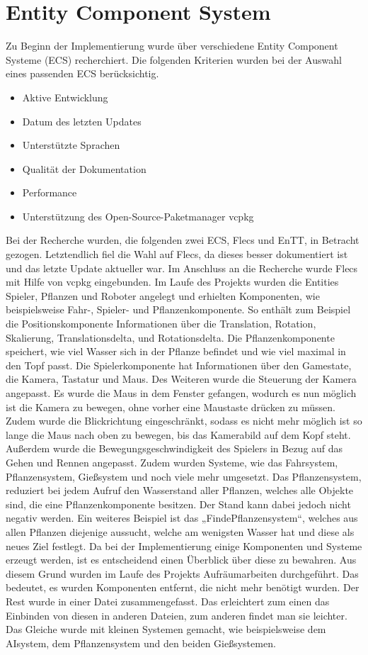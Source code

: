 
\section{Entity Component System}
Zu Beginn der Implementierung wurde über verschiedene Entity Component Systeme (ECS) recherchiert. Die folgenden Kriterien wurden bei der Auswahl eines passenden ECS berücksichtig. 
\begin{itemize}
	\item Aktive Entwicklung
	\item Datum des letzten Updates
	\item Unterstützte Sprachen
	\item Qualität der Dokumentation
	\item Performance
	\item Unterstützung des Open-Source-Paketmanager vcpkg
\end{itemize}
Bei der Recherche wurden, die folgenden zwei ECS, Flecs und EnTT, in Betracht gezogen. Letztendlich fiel die Wahl auf Flecs, da dieses besser dokumentiert ist und das letzte Update aktueller war. 
Im Anschluss an die Recherche wurde Flecs mit Hilfe von vcpkg eingebunden. Im Laufe des Projekts wurden die Entities Spieler, Pflanzen und Roboter angelegt und erhielten Komponenten, wie beispielsweise Fahr-, Spieler- und Pflanzenkomponente. So enthält zum Beispiel die Positionskomponente Informationen über die Translation, Rotation, Skalierung, Translationsdelta, und Rotationsdelta. Die Pflanzenkomponente speichert, wie viel Wasser sich in der Pflanze befindet und wie viel maximal in den Topf passt. Die Spielerkomponente hat Informationen über den Gamestate, die Kamera, Tastatur und Maus. Des Weiteren wurde die Steuerung der Kamera angepasst. Es wurde die Maus in dem Fenster gefangen, wodurch es nun möglich ist die Kamera zu bewegen, ohne vorher eine Maustaste drücken zu müssen. Zudem wurde die Blickrichtung eingeschränkt, sodass es nicht mehr möglich ist so lange die Maus nach oben zu bewegen, bis das Kamerabild auf dem Kopf steht. Außerdem wurde die Bewegungsgeschwindigkeit des Spielers in Bezug auf das Gehen und Rennen angepasst.
Zudem wurden Systeme, wie das Fahrsystem, Pflanzensystem, Gießsystem und noch viele mehr umgesetzt. Das Pflanzensystem, reduziert bei jedem Aufruf den Wasserstand aller Pflanzen, welches alle Objekte sind, die eine Pflanzenkomponente besitzen. Der Stand kann dabei jedoch nicht negativ werden. Ein weiteres Beispiel ist das „FindePflanzensystem“, welches aus allen Pflanzen diejenige aussucht, welche am wenigsten Wasser hat und diese als neues Ziel festlegt.
Da bei der Implementierung einige Komponenten und Systeme erzeugt werden, ist es entscheidend einen Überblick über diese zu bewahren. Aus diesem Grund wurden im Laufe des Projekts Aufräumarbeiten durchgeführt. Das bedeutet, es wurden Komponenten entfernt, die nicht mehr benötigt wurden. Der Rest wurde in einer Datei zusammengefasst. Das erleichtert zum einen das Einbinden von diesen in anderen Dateien, zum anderen findet man sie leichter. Das Gleiche wurde mit kleinen Systemen gemacht, wie beispielsweise dem AIsystem, dem Pflanzensystem und den beiden Gießsystemen.

